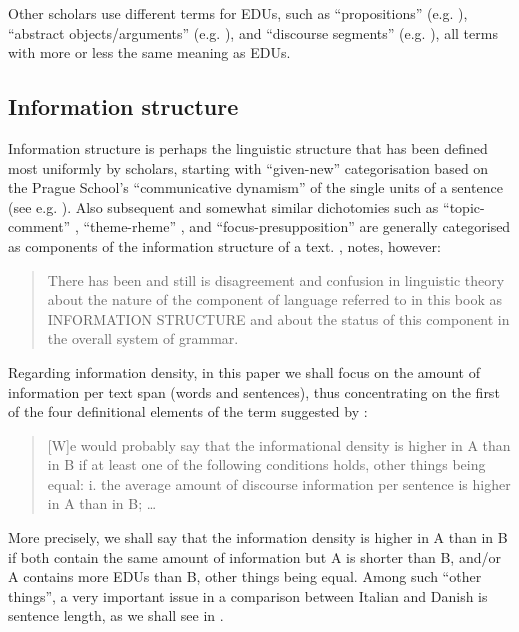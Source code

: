 \documentclass[output=paper]{LSP/langsci}
\begin{document}
Other scholars use different terms for EDUs, such as ``propositions'' (e.g. \citealt{Lehmann1988}), ``abstract objects/arguments'' (e.g. \citealt{PrasadEtAl2008}), and ``discourse segments'' (e.g. \citealt[128]{Irmer2011}), all terms with more or less the same meaning as EDUs. 

\subsection{Information structure}\label{sec:korzen:2.3}

Information structure is perhaps the linguistic structure that has been defined most uniformly by scholars, starting with  ``given-new'' categorisation based on the Prague School's ``communicative dynamism'' of the single units of a sentence (see e.g. \citealt{Vachek1966}). Also subsequent and somewhat similar dichotomies such as ``topic-comment'' \citep{Hockett1958}, ``theme-rheme'' \citep{Firbas1974}, and ``focus-presupposition'' \citep{Krifka1993} are generally categorised as components of the information structure of a text. \citet[1]{Lambrecht1994}, notes, however:

\begin{quote}
\textmd{There has been and still is disagreement and confusion in linguistic theory about the nature of the component of language referred to in this book as {\sc INFORMATION STRUCTURE} and about the status of this component in the overall system of grammar.}
\end{quote}

Regarding information density, in this paper we shall focus on the amount of information per text span (words and sentences), thus concentrating on the first of the four definitional elements of the term suggested by \citet[529]{Fabricius-Hansen1996}:

\begin{quote}
[W]e would probably say that the informational density is higher in A than in B if at least one of the following conditions holds, other things being equal: i. the average amount of discourse information per sentence is higher in A than in B; \ldots 
\end{quote}

More precisely, we shall say that the information density is higher in A than in B if both contain the same amount of information but A is shorter than B, and/or A contains more EDUs than B, other things being equal. Among such ``other things'', a very important issue in a comparison between Italian and Danish is sentence length, as we shall see in .
\end{document}
